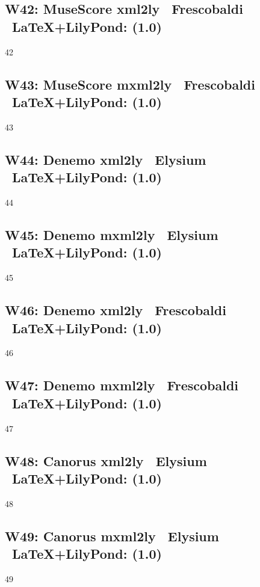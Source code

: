 \subsection{W42: MuseScore \ra xml2ly \ra\ Frescobaldi \ra\ \LaTeX+LilyPond: (1.0)} 

42

\subsection{W43: MuseScore \ra mxml2ly \ra\ Frescobaldi \ra\ \LaTeX+LilyPond: (1.0)} 

43

\subsection{W44: Denemo \ra xml2ly \ra\ Elysium \ra\ \LaTeX+LilyPond: (1.0)} 

44

\subsection{W45: Denemo \ra mxml2ly \ra\ Elysium \ra\ \LaTeX+LilyPond: (1.0)} 

45

\subsection{W46: Denemo \ra xml2ly \ra\ Frescobaldi \ra\ \LaTeX+LilyPond: (1.0)}

46

\subsection{W47: Denemo \ra mxml2ly \ra\ Frescobaldi \ra\ \LaTeX+LilyPond: (1.0)}

47

\subsection{W48: Canorus \ra xml2ly \ra\ Elysium \ra\ \LaTeX+LilyPond: (1.0)}

48

\subsection{W49: Canorus \ra mxml2ly \ra\ Elysium \ra\ \LaTeX+LilyPond: (1.0)}

49


